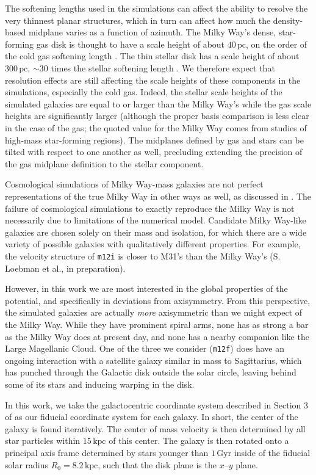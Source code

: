 \documentclass[twocolumn]{aastex62}
\newcommand{\pc}{\text{pc}}
\newcommand{\kpc}{\text{kpc}}
\newcommand{\Gyr}{\text{Gyr}}
\newcommand{\mi}{\texttt{m12i}}
\newcommand{\mf}{\texttt{m12f}}
\begin{document}
The softening lengths used in the simulations can affect the ability to
resolve the very thinnest planar structures, which in turn can affect how much
the density-based midplane varies as a function of azimuth. The Milky Way's
dense, star-forming gas disk is thought to have a scale height of about
$40\,\pc$, on the order of the cold gas softening length
\citep{2019ApJ...871..145A}. The thin stellar disk has a scale height of about
$300\,\pc$, $\sim30$ times the stellar softening length
\citep{2008ApJ...673..864J}. We therefore expect that resolution effects are
still affecting the scale heights of these components in the simulations,
especially the cold gas. Indeed, the stellar scale heights of the simulated
galaxies are equal to or larger than the Milky Way's while the gas scale
heights are significantly larger (although the proper basis comparison is less
clear in the case of the gas; the quoted value for the Milky Way comes from
studies of high-mass star-forming regions). 
The 
midplanes defined by gas and stars can be tilted with respect to one another as well,
precluding extending the precision of the gas midplane definition to the
stellar component.

Cosmological simulations of Milky Way-mass galaxies are not perfect
representations of the true Milky Way in other ways as well,
as discussed in \citet{2018arXiv180610564S}.
The failure of cosmological simulations to exactly reproduce the Milky
Way is not necessarily due to limitations of the numerical
model. Candidate Milky Way-like galaxies are chosen solely on their
mass and isolation, for which there are a wide variety of possible galaxies with qualitatively different
properties. 
For example,
the velocity structure of \mi{} is closer to M31's than the Milky
Way's (S. Loebman et al., in preparation). 

However, in this work we are most interested in the global properties of the
potential, and specifically in deviations from axisymmetry. From this
perspective, the simulated galaxies are actually \emph{more} axisymmetric than
we might expect of the Milky Way. While they have prominent spiral arms, none
has as strong a bar as the Milky Way does at present day, and none has a
nearby companion like the Large Magellanic Cloud. One of the three we consider
(\mf) does have an ongoing interaction with a satellite galaxy similar in mass to
Sagittarius, which has punched through the Galactic disk outside the solar
circle, leaving behind some of its stars and inducing warping in the disk.

In this work, we take the galactocentric coordinate system described in
Section 3 of \citet{2018arXiv180610564S} as our fiducial coordinate system for
each galaxy. In short, the center of the galaxy is found iteratively. The
center of mass velocity is then determined by all star particles within
$15\,\kpc$ of this center. The galaxy is then rotated onto a principal axis
frame determined by stars younger than $1\,\Gyr$ inside of the fiducial solar
radius $R_{0} = 8.2\,\kpc$, such that the disk plane is the $x$--$y$ plane.
\end{document}
